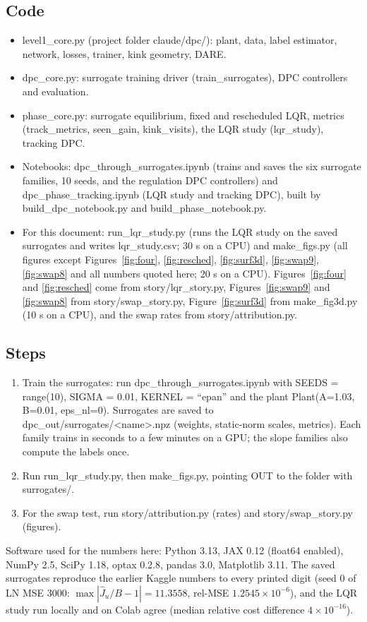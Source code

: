 \documentclass[11pt]{article}
\begin{document}
\subsection{Code}
\begin{itemize}
\item level1\_core.py (project folder claude/dpc/): plant, data, label estimator, network, losses, trainer, kink geometry, DARE.
\item dpc\_core.py: surrogate training driver (train\_surrogates), DPC controllers and evaluation.
\item phase\_core.py: surrogate equilibrium, fixed and rescheduled LQR, metrics (track\_metrics, seen\_gain, kink\_visits), the LQR study (lqr\_study), tracking DPC.
\item Notebooks: dpc\_through\_surrogates.ipynb (trains and saves the six surrogate families, 10 seeds, and the regulation DPC controllers) and dpc\_phase\_tracking.ipynb (LQR study and tracking DPC), built by build\_dpc\_notebook.py and build\_phase\_notebook.py.
\item For this document: run\_lqr\_study.py (runs the LQR study on the saved surrogates and writes lqr\_study.csv; 30 s on a CPU) and make\_figs.py (all figures except Figures~\ref{fig:four}, \ref{fig:resched}, \ref{fig:surf3d}, \ref{fig:swap9}, \ref{fig:swap8} and all numbers quoted here; 20 s on a CPU). Figures~\ref{fig:four} and \ref{fig:resched} come from story/lqr\_story.py, Figures~\ref{fig:swap9} and \ref{fig:swap8} from story/swap\_story.py, Figure~\ref{fig:surf3d} from make\_fig3d.py (10 s on a CPU), and the swap rates from story/attribution.py.
\end{itemize}

\subsection{Steps}
\begin{enumerate}
\item Train the surrogates: run dpc\_through\_surrogates.ipynb with SEEDS = range(10), SIGMA = 0.01, KERNEL = ``epan'' and the plant Plant(A=1.03, B=0.01, eps\_nl=0). Surrogates are saved to dpc\_out/surrogates/<name>.npz (weights, static-norm scales, metrics). Each family trains in seconds to a few minutes on a GPU; the slope families also compute the labels once.
\item Run run\_lqr\_study.py, then make\_figs.py, pointing OUT to the folder with surrogates/.
\item For the swap test, run story/attribution.py (rates) and story/swap\_story.py (figures).
\end{enumerate}
Software used for the numbers here: Python 3.13, JAX 0.12 (float64 enabled), NumPy 2.5, SciPy 1.18, optax 0.2.8, pandas 3.0, Matplotlib 3.11. The saved surrogates reproduce the earlier Kaggle numbers to every printed digit (seed 0 of LN MSE 3000: $\max|\hat J_u/B-1|=11.3558$, rel-MSE $1.2545\times10^{-6}$), and the LQR study run locally and on Colab agree (median relative cost difference $4\times10^{-16}$).
\end{document}
